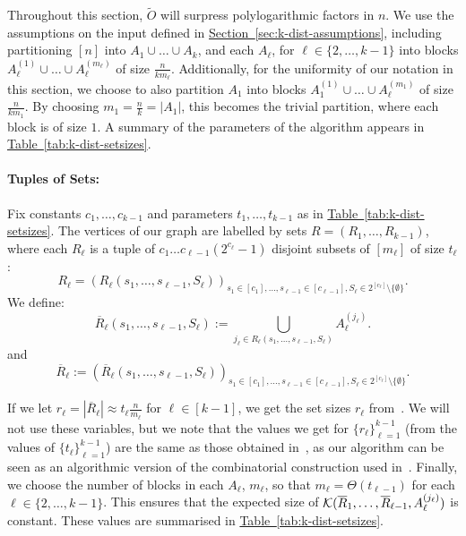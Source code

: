 \documentclass{article}
\renewcommand{\sec}[1]{\hyperref[sec:#1]{Section~\ref*{sec:#1}}}
\newcommand{\tabl}[1]{\hyperref[tab:#1]{Table~\ref*{tab:#1}}}
\renewcommand{\>}{\rangle}
\newcommand{\<}{\langle}
\renewcommand{\(}{\left(}
\renewcommand{\)}{\right)}
\def\abs#1{\left| #1 \right|}
\begin{document}
\noindent Throughout this section, $\widetilde{O}$ will surpress polylogarithmic factors in $n$.
We use the assumptions on the input defined in \sec{k-dist-assumptions}, including partitioning $[n]$ into $A_1\cup\dots\cup A_k$, and each $A_{\ell}$, for $\ell\in\{2,\dots, k-1\}$ into blocks $A_{\ell}^{(1)}\cup\dots\cup A_{\ell}^{(m_{\ell})}$ of size $\frac{n}{km_{\ell}}$. Additionally, for the uniformity of our notation in this section, we choose to also partition $A_1$ into blocks $A_{1}^{(1)}\cup\dots\cup A_{\ell}^{(m_{1})}$ of size $\frac{n}{km_{1}}$. By choosing $m_1 = \frac{n}{k} = \abs{A_1}$, this becomes the trivial partition, where each block is of size $1$. A summary of the parameters of the algorithm appears in \tabl{k-dist-setsizes}.

\paragraph{Tuples of Sets:} Fix constants $c_1,\dots,c_{k-1}$ and parameters $t_1,\dots,t_{k-1}$ as in \tabl{k-dist-setsizes}. The vertices of our graph are labelled by sets $R=(R_1,\dots,R_{k-1})$, where each $R_{\ell}$ is a tuple of $c_1\dots c_{\ell-1}(2^{c_{\ell}}-1)$ disjoint subsets of $[m_{\ell}]$ of size $t_\ell$:
$$R_{\ell}=(R_{\ell}(s_1,\dots,s_{\ell-1},S_{\ell}))_{s_1\in [c_1],\dots,s_{\ell-1}\in [c_{\ell-1}],S_{\ell}\in 2^{[c_{\ell}]}\setminus\{\emptyset\}}.$$
We define:
$$\overline{R}_{\ell}(s_1,\dots,s_{\ell-1},S_{\ell}):= 
\bigcup_{j_{\ell}\in R_{\ell}(s_1,\dots,s_{\ell-1},S_{\ell})}A_{\ell}^{(j_{\ell})}.$$
and
$$\overline{R}_{\ell}:=
(\overline{R}_{\ell}(s_1,\dots,s_{\ell-1},S_{\ell}))_{s_1\in [c_1],\dots,s_{\ell-1}\in [c_{\ell-1}],S_{\ell}\in 2^{[c_{\ell}]}\setminus\{\emptyset\}}.$$

If we let $r_{\ell}=|\overline{R}_{\ell}|\approx t_{\ell}\frac{n}{m_{\ell}}$ for $\ell\in [k-1]$, we get the set sizes $r_{\ell}$ from~\cite{belovs2012kDist}. We will not use these variables, but we note that the values we get for $\{r_{\ell}\}_{\ell=1}^{k-1}$ (from the values of $\{t_{\ell}\}_{\ell=1}^{k-1}$) are the same as those obtained in~\cite{belovs2012kDist}, as our algorithm can be seen as an algorithmic version of the combinatorial construction used in~\cite{belovs2012kDist}. Finally, we choose the number of blocks in each $A_{\ell}$, $m_{\ell}$, so that $m_{\ell}=\Theta(t_{\ell-1})$ for each $\ell\in \{2,\dots,k-1\}$. This ensures that the expected size of ${\cal K}(\overline{R}_1,\dots,\overline{R}_{\ell-1},A_{\ell}^{(j_{\ell})})$ is constant. These values are summarised in \tabl{k-dist-setsizes}.
\end{document}
